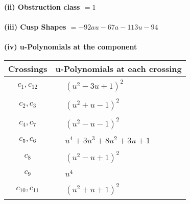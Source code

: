 \documentclass[1p]{elsarticle_modified}
\theoremstyle{definition}
\begin{document}
\flushleft \textbf{(ii) Obstruction class $= 1$}\\~\\
\flushleft \textbf{(iii) Cusp Shapes $= -92 a u-67 a-113 u-94$}\\~\\
\newpage\renewcommand{\arraystretch}{1}
\flushleft \textbf{(iv) u-Polynomials at the component}\newline \\
\begin{tabular}{m{50pt}|m{274pt}}
Crossings & \hspace{64pt}u-Polynomials at each crossing \\
\hline $$\begin{aligned}c_{1},c_{12}\end{aligned}$$&$\begin{aligned}
&(u^2-3 u+1)^2
\end{aligned}$\\
\hline $$\begin{aligned}c_{2},c_{3}\end{aligned}$$&$\begin{aligned}
&(u^2+u-1)^2
\end{aligned}$\\
\hline $$\begin{aligned}c_{4},c_{7}\end{aligned}$$&$\begin{aligned}
&(u^2- u-1)^2
\end{aligned}$\\
\hline $$\begin{aligned}c_{5},c_{6}\end{aligned}$$&$\begin{aligned}
&u^4+3 u^3+8 u^2+3 u+1
\end{aligned}$\\
\hline $$\begin{aligned}c_{8}\end{aligned}$$&$\begin{aligned}
&(u^2- u+1)^2
\end{aligned}$\\
\hline $$\begin{aligned}c_{9}\end{aligned}$$&$\begin{aligned}
&u^4
\end{aligned}$\\
\hline $$\begin{aligned}c_{10},c_{11}\end{aligned}$$&$\begin{aligned}
&(u^2+u+1)^2
\end{aligned}$\\
\hline
\end{tabular}\\~\\
\end{document}
